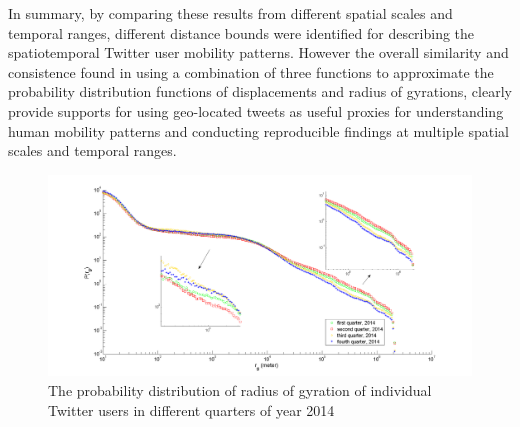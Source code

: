 \documentclass[ijgi,article,submit,moreauthors,pdftex,10pt,a4paper]{mdpi}
\theoremstyle{mdpi}
\newcounter{re}
\theoremstyle{mdpidefinition}
\begin{document}
In summary, by comparing these results from different spatial scales and temporal ranges, different distance bounds were identified for describing the spatiotemporal Twitter user mobility patterns.
However the overall similarity and consistence found in using a combination of three functions to approximate the probability distribution functions of displacements and radius of gyrations, clearly provide supports for using geo-located tweets as useful proxies for understanding human mobility patterns and conducting reproducible findings at multiple spatial scales and temporal ranges.

\begin{figure}[ht]
\centering
\includegraphics[width=1.0\linewidth]{./figures/gyration_season}
\caption{The probability distribution of radius of gyration of individual Twitter users in different quarters of year 2014}
\label{fig:gyration_season}
\end{figure}
\FloatBarrier
\end{document}
